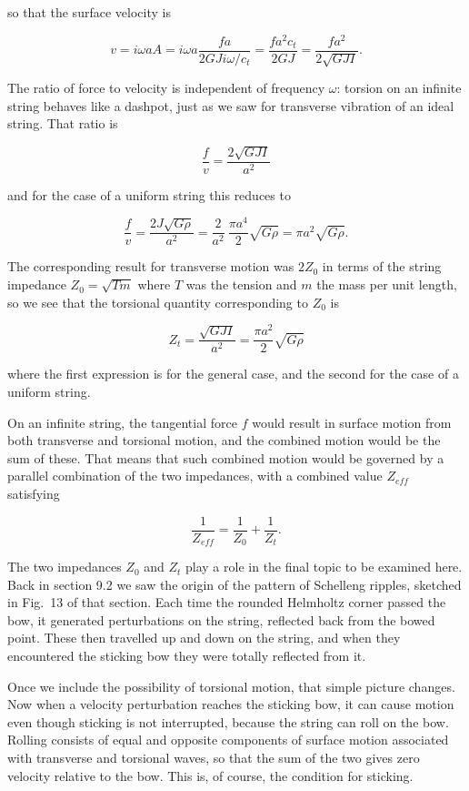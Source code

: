   so that the surface velocity is 

  $$v = i \omega a A = i \omega a \dfrac{fa}{2GJ i \omega /c_t}=\dfrac{f a^2 
  c_t}{2GJ}=\dfrac{fa^2}{2 \sqrt{GJI}} . \tag{9}$$ 

  The ratio of force to velocity is independent of frequency $\omega$: torsion 
  on an infinite string behaves like a dashpot, just as we saw for transverse 
  vibration of an ideal string. That ratio is 

  $$\dfrac{f}{v}=\dfrac{2 \sqrt{GJI}}{a^2} \tag{10}$$ 

  and for the case of a uniform string this reduces to 

  $$\dfrac{f}{v}=\dfrac{2 J\sqrt{G\rho}}{a^2}=\dfrac{2}{a^2}~\dfrac{\pi a^4}{2} 
  \sqrt{G \rho}=\pi a^2 \sqrt{G\rho} . \tag{11}$$ 

  The corresponding result for transverse motion was $2 Z_0$ in terms of the 
  string impedance $Z_0=\sqrt{T m}$ where $T$ was the tension and $m$ the mass 
  per unit length, so we see that the torsional quantity corresponding to $Z_0$ 
  is 

  $$Z_t=\dfrac{\sqrt{GJI}}{a^2}=\dfrac{\pi a^2}{2} \sqrt{G\rho} \tag{12}$$ 

  where the first expression is for the general case, and the second for the 
  case of a uniform string. 

  On an infinite string, the tangential force $f$ would result in surface 
  motion from both transverse and torsional motion, and the combined motion 
  would be the sum of these. That means that such combined motion would be 
  governed by a parallel combination of the two impedances, with a combined 
  value $Z_{eff}$ satisfying 

  $$\dfrac{1}{Z_{eff}}=\dfrac{1}{Z_0}+\dfrac{1}{Z_t} . \tag{13}$$ 

  The two impedances $Z_0$ and $Z_t$ play a role in the final topic to be 
  examined here. Back in section 9.2 we saw the origin of the pattern of 
  Schelleng ripples, sketched in Fig.\ 13 of that section. Each time the 
  rounded Helmholtz corner passed the bow, it generated perturbations on the 
  string, reflected back from the bowed point. These then travelled up and down 
  on the string, and when they encountered the sticking bow they were totally 
  reflected from it. 

  Once we include the possibility of torsional motion, that simple picture 
  changes. Now when a velocity perturbation reaches the sticking bow, it can 
  cause motion even though sticking is not interrupted, because the string can 
  roll on the bow. Rolling consists of equal and opposite components of surface 
  motion associated with transverse and torsional waves, so that the sum of the 
  two gives zero velocity relative to the bow. This is, of course, the 
  condition for sticking. 

